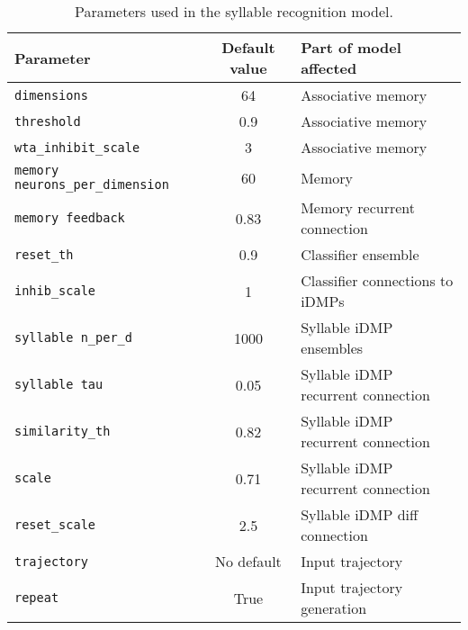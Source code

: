 \begin{table}[ht!]
  \begin{footnotesize}
    \begin{center}
      \begin{tabular}{lcl}
        \toprule
        Parameter & Default value & Part of model affected \\
        \midrule
        \texttt{dimensions} & 64 & Associative memory \\
        \texttt{threshold} & 0.9 & Associative memory \\
        \texttt{wta\_inhibit\_scale} & 3 & Associative memory \\
        \texttt{memory neurons\_per\_dimension} & 60 & Memory \\
        \texttt{memory feedback} & 0.83 & Memory recurrent connection \\
        \texttt{reset\_th} & 0.9 & Classifier ensemble \\
        \texttt{inhib\_scale} & 1 & Classifier connections to iDMPs \\
        \texttt{syllable n\_per\_d} & 1000 & Syllable iDMP ensembles \\
        \texttt{syllable tau} & 0.05 & Syllable iDMP recurrent connection \\
        \texttt{similarity\_th} & 0.82 & Syllable iDMP recurrent connection \\
        \texttt{scale} & 0.71 & Syllable iDMP recurrent connection \\
        \texttt{reset\_scale} & 2.5 & Syllable iDMP diff connection \\
        \texttt{trajectory} & No default & Input trajectory \\
        \texttt{repeat} & True & Input trajectory generation \\
        \bottomrule
      \end{tabular}
    \end{center}
  \end{footnotesize}
  \caption{Parameters used in the syllable recognition model.}
\label{tab:recog}
\end{table}



